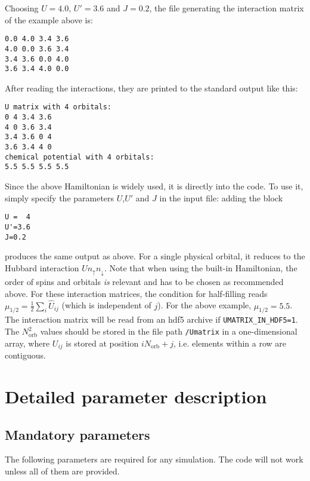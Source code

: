 \documentclass[aps,prb,floatfix,superscriptaddress,twocolumn,notitlepage]{revtex4-1}
\begin{document}
Choosing $U=4.0$, $U'=3.6$ and $J=0.2$, the file generating the interaction matrix of the example above is:
\begin{verbatim}
0.0 4.0 3.4 3.6
4.0 0.0 3.6 3.4
3.4 3.6 0.0 4.0
3.6 3.4 4.0 0.0 
\end{verbatim}
After reading the interactions, they are printed to the standard output like this:
\begin{verbatim}
U matrix with 4 orbitals: 
0 4 3.4 3.6 
4 0 3.6 3.4 
3.4 3.6 0 4 
3.6 3.4 4 0
chemical potential with 4 orbitals:
5.5 5.5 5.5 5.5
\end{verbatim}
Since the above Hamiltonian is widely used, it is directly into the code. To use it, simply specify the parameters $U$,$U'$ and $J$ in the input file: adding the block
\begin{verbatim}
U =  4
U'=3.6
J=0.2
\end{verbatim}
produces the same output as above. For a single physical orbital, it reduces to the Hubbard interaction $Un_{\uparrow}n_{\downarrow}$.
Note that when using the built-in Hamiltonian, the order of spins and orbitals \emph{is} relevant and has to be chosen as recommended above.
For these interaction matrices, the condition for half-filling reads $\mu_{1/2}=\frac{1}{2}\sum_{i}\hat{U}_{ij}$ (which is independent of $j$). For the above example, $\mu_{1/2}=5.5$.
The interaction matrix will be read from an hdf5 archive if \verb#UMATRIX_IN_HDF5=1#. The $N_{\text{orb}}^{2}$ values should be stored in the file path \verb#/Umatrix# in a one-dimensional array, where $U_{ij}$ is stored at position $iN_{\text{orb}}+j$, i.e. elements within a row are contiguous.

\section{Detailed parameter description}

\subsection{Mandatory parameters}
The following parameters are required for any simulation. The code will not work unless all of them are provided.
\end{document}
